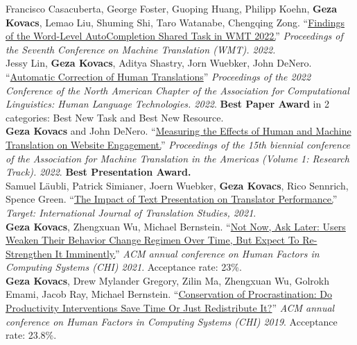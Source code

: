 
{\small Francisco Casacuberta, George Foster, Guoping Huang, Philipp Koehn,} \textbf{Geza Kovacs}, {\small Lemao Liu, Shuming Shi, Taro Watanabe, Chengqing Zong.} ``\href{https://aclanthology.org/2022.wmt-1.75.pdf}{Findings of the Word-Level AutoCompletion Shared Task in WMT 2022.}'' \emph{Proceedings of the Seventh Conference on Machine Translation (WMT). 2022.}\\

{\small Jessy Lin,} \textbf{Geza Kovacs}, {\small Aditya Shastry, Jorn Wuebker, John DeNero.} ``\href{https://aclanthology.org/2022.naacl-main.36.pdf}{Automatic Correction of Human Translations}'' \emph{Proceedings of the 2022 Conference of the North American Chapter of the Association for Computational Linguistics: Human Language Technologies. 2022}. \textbf{Best Paper Award} in 2 categories: Best New Task and Best New Resource.\\

\textbf{Geza Kovacs} {\small and John DeNero.} ``\href{https://aclanthology.org/2022.amta-research.23.pdf}{Measuring the Effects of Human and Machine Translation on Website Engagement.}'' \emph{Proceedings of the 15th biennial conference of the Association for Machine Translation in the Americas (Volume 1: Research Track). 2022}. \textbf{Best Presentation Award.}\\

{\small Samuel Läubli, Patrick Simianer, Joern Wuebker,} \textbf{Geza Kovacs}, {\small Rico Sennrich, Spence Green.} ``\href{https://arxiv.org/pdf/2011.05978.pdf}{The Impact of Text Presentation on Translator Performance.}'' \emph{Target: International Journal of Translation Studies, 2021}.\\

\textbf{Geza Kovacs}, {\small Zhengxuan Wu, Michael Bernstein.} ``\href{https://hci.stanford.edu/publications/2021/notnow/notnowasklater.pdf}{Not Now, Ask Later: Users Weaken Their Behavior Change Regimen Over Time, But Expect To Re-Strengthen It Imminently.}'' \emph{ACM annual conference on Human Factors in Computing Systems (CHI) 2021}. Acceptance rate: 23\%.\\ %

\textbf{Geza Kovacs}, {\small Drew Mylander Gregory, Zilin Ma, Zhengxuan Wu, Golrokh Emami, Jacob Ray, Michael Bernstein.} ``\href{https://hci.stanford.edu/publications/2019/conservation/conservation-chi2019.pdf}{Conservation of Procrastination: Do Productivity Interventions Save Time Or Just Redistribute It?}'' \emph{ACM annual conference on Human Factors in Computing Systems (CHI) 2019}. Acceptance rate: 23.8\%.\\ %

